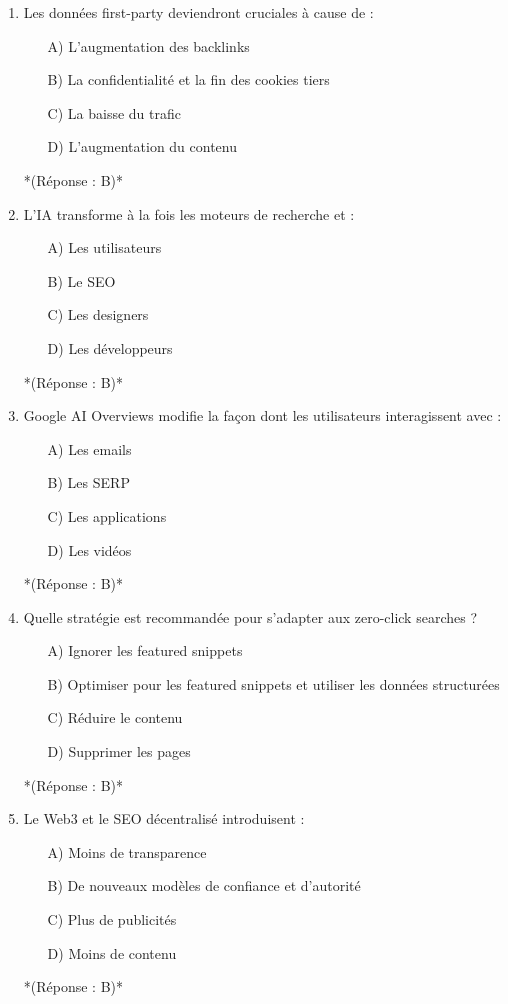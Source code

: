 \documentclass[12pt,a4paper,twoside]{report}
\begin{document}
\begin{enumerate}
    \item Les données first-party deviendront cruciales à cause de :
    \begin{itemize}
        \item[A)] L'augmentation des backlinks
        \item[B)] La confidentialité et la fin des cookies tiers
        \item[C)] La baisse du trafic
        \item[D)] L'augmentation du contenu
    \end{itemize}
    *(Réponse : B)*

    \item L'IA transforme à la fois les moteurs de recherche et :
    \begin{itemize}
        \item[A)] Les utilisateurs
        \item[B)] Le SEO
        \item[C)] Les designers
        \item[D)] Les développeurs
    \end{itemize}
    *(Réponse : B)*

    \item Google AI Overviews modifie la façon dont les utilisateurs interagissent avec :
    \begin{itemize}
        \item[A)] Les emails
        \item[B)] Les SERP
        \item[C)] Les applications
        \item[D)] Les vidéos
    \end{itemize}
    *(Réponse : B)*

    \item Quelle stratégie est recommandée pour s'adapter aux zero-click searches ?
    \begin{itemize}
        \item[A)] Ignorer les featured snippets
        \item[B)] Optimiser pour les featured snippets et utiliser les données structurées
        \item[C)] Réduire le contenu
        \item[D)] Supprimer les pages
    \end{itemize}
    *(Réponse : B)*

    \item Le Web3 et le SEO décentralisé introduisent :
    \begin{itemize}
        \item[A)] Moins de transparence
        \item[B)] De nouveaux modèles de confiance et d'autorité
        \item[C)] Plus de publicités
        \item[D)] Moins de contenu
    \end{itemize}
    *(Réponse : B)*


\end{enumerate}
\end{document}
